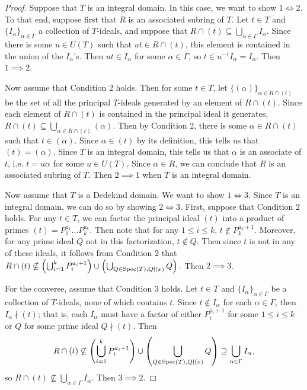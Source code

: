 \documentclass[12pt]{amsart}
\theoremstyle{definition}
\newcommand{\spec}{\textup{Spec}}
\begin{document}
	\begin{proof}
		Suppose that $T$ is an integral domain. In this case, we want to show $1\iff 2$. To that end, suppose first that $R$ is an associated subring of $T$. Let $t\in T$ and $\{I_\alpha\}_{\alpha\in\Gamma}$ a collection of $T$-ideals, and suppose that $R\cap (t)\subseteq \bigcup_{\alpha\in\Gamma}I_\alpha$. Since there is some $u\in U(T)$ such that $ut\in R\cap (t)$, this element is contained in the union of the $I_\alpha$'s. Then $ut\in I_\alpha$ for some $\alpha\in \Gamma$, so $t\in u^{-1}I_\alpha=I_\alpha$. Then $1\implies 2$.
		
		Now assume that Condition 2 holds. Then for some $t\in T$, let $\{(\alpha)\}_{\alpha\in R\cap (t)}$ be the set of all the principal $T$-ideals generated by an element of $R\cap (t)$. Since each element of $R\cap (t)$ is contained in the principal ideal it generates, $R\cap (t)\subseteq \bigcup_{\alpha\in R\cap (t)}(\alpha)$. Then by Condition 2, there is some $\alpha\in R\cap (t)$ such that $t\in (\alpha)$. Since $\alpha\in (t)$ by its definition, this tells us that $(t)=(\alpha)$. Since $T$ is an integral domain, this tells us that $\alpha$ is an associate of $t$, i.e. $t=u\alpha$ for some $u\in U(T)$. Since $\alpha\in R$, we can conclude that $R$ is an associated subring of $T$. Then $2\implies 1$ when $T$ is an integral domain.
		
		Now assume that $T$ is a Dedekind domain. We want to show $1\iff 3$. Since $T$ is an integral domain, we can do so by showing $2\iff 3$. First, suppose that Condition 2 holds. For any $t\in T$, we can factor the principal ideal $(t)$ into a product of primes $(t)=P_1^{a_1}\dots P_k^{a_k}$. Then note that for any $1\leq i\leq k$, $t\notin P_k^{a_k+1}$. Moreover, for any prime ideal $Q$ not in this factorization, $t\notin Q$. Then since $t$ is not in any of these ideals, it follows from Condition 2 that $R\cap (t)\nsubseteq \left(\bigcup_{i=1}^kP_i^{a_i+1}\right)\cup\left(\bigcup_{Q\in\spec(T),Q\nmid (x)}Q\right).$ Then $2\implies 3$.
		
		For the converse, assume that Condition 3 holds. Let $t\in T$ and $\{I_\alpha\}_{\alpha\in \Gamma}$ be a collection of $T$-ideals, none of which contains $t$. Since $t\notin I_\alpha$ for each $\alpha\in \Gamma$, then $I_\alpha\nmid (t)$; that is, each $I_\alpha$ must have a factor of either $P_i^{a_i+1}$ for some $1\leq i\leq k$ or $Q$ for some prime ideal $Q\nmid (t)$. Then $$R\cap (t)\nsubseteq \left(\bigcup_{i=1}^kP_i^{a_i+1}\right)\cup\left(\bigcup_{Q\in\spec(T),Q\nmid (x)}Q\right)\supseteq \bigcup_{\alpha\in \Gamma} I_\alpha,$$ so $R\cap (t)\nsubseteq \bigcup_{\alpha\in \Gamma} I_\alpha$. Then $3\implies 2$.
		

\end{proof}
\end{document}
